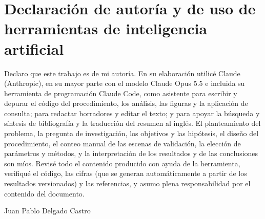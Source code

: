 \chapter*{Declaración de autoría y de uso de herramientas de inteligencia artificial}

Declaro que este trabajo es de mi autoría. En su elaboración utilicé Claude (Anthropic), en su
mayor parte con el modelo Claude Opus 5.5 e incluida su herramienta de programación Claude Code,
como asistente para escribir y depurar el
código del procedimiento, los análisis, las figuras y la aplicación de consulta; para redactar
borradores y editar el texto; y para apoyar la búsqueda y síntesis de bibliografía y la
traducción del resumen al inglés. El planteamiento del problema, la pregunta de investigación,
los objetivos y las hipótesis, el diseño del procedimiento, el conteo manual de las
\cVN{} escenas de validación, la elección de parámetros y métodos, y la interpretación de los
resultados y de las conclusiones son míos. Revisé todo el contenido producido con ayuda de la
herramienta, verifiqué el código, las cifras (que se generan automáticamente a partir de los
resultados versionados) y las referencias, y asumo plena responsabilidad por el contenido del
documento.

\vspace{1.2cm}
\noindent Juan Pablo Delgado Castro

\clearpage
